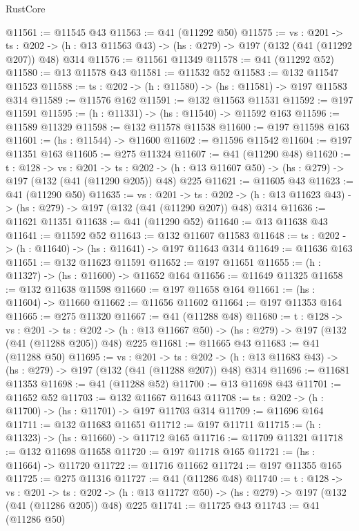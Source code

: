 \begin{lexlean}{RustCore}
\begin{coremodule}
@11561 := @11545 @43
@11563 := @41 (@11292 @50)
@11575 := {vs : @201} ->
  {ts : @202} -> (h : @13 @11563 @43) -> (hs : @279) -> @197 (@132 (@41 (@11292 @207)) @48) @314
@11576 := @11561 @11349
@11578 := @41 (@11292 @52)
@11580 := @13 @11578 @43
@11581 := @11532 @52
@11583 := @132 @11547 @11523
@11588 := {ts : @202} -> (h : @11580) -> (hs : @11581) -> @197 @11583 @314
@11589 := @11576 @162
@11591 := @132 @11563 @11531
@11592 := @197 @11591
@11595 := (h : @11331) -> (hs : @11540) -> @11592 @163
@11596 := @11589 @11329
@11598 := @132 @11578 @11538
@11600 := @197 @11598 @163
@11601 := (hs : @11544) -> @11600
@11602 := @11596 @11542
@11604 := @197 @11351 @163
@11605 := @275 @11324
@11607 := @41 (@11290 @48)
@11620 := {t : @128} ->
  {vs : @201} ->
  {ts : @202} -> (h : @13 @11607 @50) -> (hs : @279) -> @197 (@132 (@41 (@11290 @205)) @48) @225
@11621 := @11605 @43
@11623 := @41 (@11290 @50)
@11635 := {vs : @201} ->
  {ts : @202} -> (h : @13 @11623 @43) -> (hs : @279) -> @197 (@132 (@41 (@11290 @207)) @48) @314
@11636 := @11621 @11351
@11638 := @41 (@11290 @52)
@11640 := @13 @11638 @43
@11641 := @11592 @52
@11643 := @132 @11607 @11583
@11648 := {ts : @202} -> (h : @11640) -> (hs : @11641) -> @197 @11643 @314
@11649 := @11636 @163
@11651 := @132 @11623 @11591
@11652 := @197 @11651
@11655 := (h : @11327) -> (hs : @11600) -> @11652 @164
@11656 := @11649 @11325
@11658 := @132 @11638 @11598
@11660 := @197 @11658 @164
@11661 := (hs : @11604) -> @11660
@11662 := @11656 @11602
@11664 := @197 @11353 @164
@11665 := @275 @11320
@11667 := @41 (@11288 @48)
@11680 := {t : @128} ->
  {vs : @201} ->
  {ts : @202} -> (h : @13 @11667 @50) -> (hs : @279) -> @197 (@132 (@41 (@11288 @205)) @48) @225
@11681 := @11665 @43
@11683 := @41 (@11288 @50)
@11695 := {vs : @201} ->
  {ts : @202} -> (h : @13 @11683 @43) -> (hs : @279) -> @197 (@132 (@41 (@11288 @207)) @48) @314
@11696 := @11681 @11353
@11698 := @41 (@11288 @52)
@11700 := @13 @11698 @43
@11701 := @11652 @52
@11703 := @132 @11667 @11643
@11708 := {ts : @202} -> (h : @11700) -> (hs : @11701) -> @197 @11703 @314
@11709 := @11696 @164
@11711 := @132 @11683 @11651
@11712 := @197 @11711
@11715 := (h : @11323) -> (hs : @11660) -> @11712 @165
@11716 := @11709 @11321
@11718 := @132 @11698 @11658
@11720 := @197 @11718 @165
@11721 := (hs : @11664) -> @11720
@11722 := @11716 @11662
@11724 := @197 @11355 @165
@11725 := @275 @11316
@11727 := @41 (@11286 @48)
@11740 := {t : @128} ->
  {vs : @201} ->
  {ts : @202} -> (h : @13 @11727 @50) -> (hs : @279) -> @197 (@132 (@41 (@11286 @205)) @48) @225
@11741 := @11725 @43
@11743 := @41 (@11286 @50)

\end{coremodule}
\end{lexlean}
